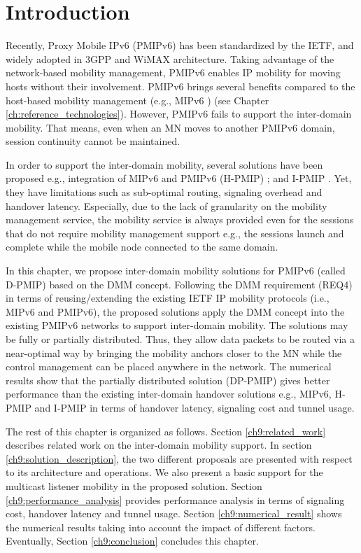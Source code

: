 
\section{Introduction}
Recently, Proxy Mobile IPv6 (PMIPv6) \cite{PMIPv6} has been standardized by the IETF, and widely adopted in 3GPP and WiMAX architecture. Taking advantage of the network-based mobility management, PMIPv6 enables IP mobility for moving hosts without their involvement. PMIPv6 brings several benefits compared to the host-based mobility management (e.g., MIPv6 \cite{MIPv6}) (see Chapter \ref{ch:reference_technologies}). However, PMIPv6 fails to support the inter-domain mobility. That means, even when an MN moves to another PMIPv6 domain, session continuity cannot be maintained.

In order to support the inter-domain mobility, several solutions have been proposed e.g., integration of MIPv6 and PMIPv6 (H-PMIP) \cite{rfc6612}; and I-PMIP \cite{i-pmip}. Yet, they have limitations such as sub-optimal routing, signaling overhead and handover latency. Especially, due to the lack of granularity on the mobility management service, the mobility service is always provided even for the sessions that do not require mobility management support e.g., the sessions launch and complete while the mobile node connected to the same domain. 

In this chapter, we propose inter-domain mobility solutions for PMIPv6 (called D-PMIP) based on the DMM concept. Following the DMM requirement (REQ4) in terms of reusing/extending the existing IETF IP mobility protocols (i.e., MIPv6 and PMIPv6), the proposed solutions apply the DMM concept into the existing PMIPv6 networks to support inter-domain mobility. The solutions may be fully or partially distributed. Thus, they allow data packets to be routed via a near-optimal way by bringing the mobility anchors closer to the MN while the control management can be placed anywhere in the network. The numerical results show that the partially distributed solution (DP-PMIP) gives better performance than the existing inter-domain handover solutions e.g., MIPv6, H-PMIP and I-PMIP in terms of handover latency, signaling cost and tunnel usage. 

The rest of this chapter is organized as follows. Section \ref{ch9:related_work} describes related work on the inter-domain mobility support. In section \ref{ch9:solution_description}, the two different proposals are presented with respect to its architecture and operations. We also present a basic support for the multicast listener mobility in the proposed solution. Section \ref{ch9:performance_analysis} provides performance analysis in terms of signaling cost, handover latency and tunnel usage. Section \ref{ch9:numerical_result} shows the numerical results taking into account the impact of different factors. Eventually, Section \ref{ch9:conclusion} concludes this chapter.  

